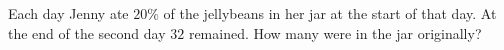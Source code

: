Each day Jenny ate $20\%$ of the jellybeans in her jar at the start of that day. At the end of the second day $32$ remained. How many were in the jar originally?
